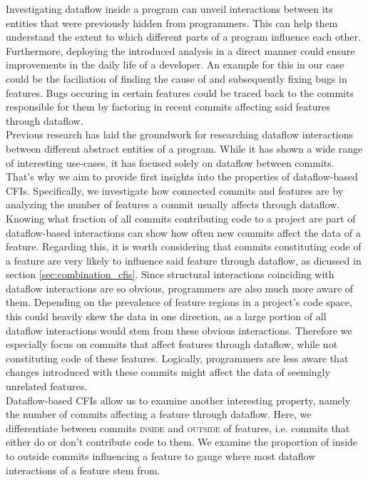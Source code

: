 Investigating dataflow inside a program can unveil interactions between its entities that were previously hidden from programmers.
This can help them understand the extent to which different parts of a program influence each other.
Furthermore, deploying the introduced analysis in a direct manner could ensure improvements in the daily life of a developer.
An example for this in our case could be the faciliation of finding the cause of and subsequently fixing bugs in features.
Bugs occuring in certain features could be traced back to the commits responsible for them by factoring in recent commits affecting said features through dataflow. \\
Previous research has laid the groundwork for researching dataflow interactions between different abstract entities of a program.
While it has shown a wide range of interesting use-cases, it has focused solely on dataflow between commits.
That's why we aim to provide first insights into the properties of dataflow-based CFIs.
Specifically, we investigate how connected commits and features are by analyzing the number of features a commit usually affects through dataflow.
Knowing what fraction of all commits contributing code to a project are part of dataflow-based interactions can show how often new commits affect the data of a feature. 
Regarding this, it is worth considering that commits constituting code of a feature are very likely to influence said feature through dataflow, as dicussed in section \ref{sec:combination_cfis}.
Since structural interactions coinciding with dataflow interactions are so obvious, programmers are also much more aware of them. 
Depending on the prevalence of feature regions in a project's code space, this could heavily skew the data in one direction, as a large portion of all dataflow interactions would stem from these obvious interactions. 
Therefore we especially focus on commits that affect features through dataflow, while not constituting code of these features.
Logically, programmers are less aware that changes introduced with these commits might affect the data of seemingly unrelated features. \\
Dataflow-based CFIs allow us to examine another interesting property, namely the number of commits affecting a feature through dataflow.
Here, we differentiate between commits \textsc{inside} and \textsc{outside} of features, i.e. commits that either do or don't contribute code to them.
We examine the proportion of inside to outside commits influencing a feature to gauge where most dataflow interactions of a feature stem from.
